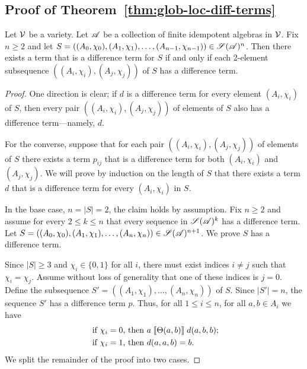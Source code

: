 \subsection{Proof of Theorem~\ref{thm:glob-loc-diff-terms}}
\label{sec:proof-thm:glob}
\begin{theorem}[\ref{thm:glob-loc-diff-terms}]
  Let $\mathcal{V}$ be a variety.  Let $\mathscr{A}$ be a collection of finite idempotent
  algebras in $\mathcal{V}$. Fix $n\geq 2$ and 
  let $S= ((A_0, \chi_0), (A_1, \chi_1), \dots, (A_{n-1}, \chi_{n-1}))\in \mathscr{S}(\mathscr{A})^n$.
  Then there exists a term that is a \glocal difference term for $S$
  if and only if each 2-element subsequence $((A_i,\chi_i), (A_j,\chi_j))$ of $S$
  has a \glocal difference term.
\end{theorem}
\begin{proof}
  One direction is clear; if $d$ is a \glocal difference term for every
  element $(A_i, \chi_i)$ of $S$, then  every pair $((A_i,\chi_i),
  (A_j,\chi_j))$ of elements of $S$ also has a \glocal difference
  term---namely, $d$.

  For the converse, suppose that
  for each pair $((A_i,\chi_i), (A_j,\chi_j))$ of elements of $S$ there exists a
  term $p_{ij}$ that is a \glocal difference term for both
  $(A_i,\chi_i)$ and $(A_j,\chi_j)$.
  We will prove by induction on the length of $S$ that
  there exists a term $d$ that is a \glocal difference term for every
  $(A_i, \chi_i)$ in $S$.

  In the base case, $n = |S| = 2$, the claim holds by assumption.
  Fix $n\geq 2$ and assume for every
  $2\leq k \leq n$ that every sequence in $\mathscr{S}(\mathscr{A})^k$
  has a \glocal difference term. Let
  $S = ((A_0, \chi_0), (A_1, \chi_1), \dots, (A_{n},\chi_{n})) \in \mathscr{S}(\mathscr{A})^{n+1}$.
  We prove  $S$ has a \glocal difference term.

  Since $|S| \geq 3$ and $\chi_i \in \{0,1\}$ for all $i$, there must exist
  indices $i\neq j$ such that $\chi_i = \chi_j$. Assume without loss of generality
  that one of these indices is $j=0$.  Define the subsequence
  $S' = ((A_1, \chi_1), \dots,(A_{n},\chi_{n}))$ of $S$. %
  Since $|S'| = n$, the sequence $S'$ has a \glocal difference term $p$.
  Thus, for all $1\leq i \leq n$,
  for all $a, b\in A_i$  we have
  \begin{align*}
    \text{ if $\chi_i=0$, then } &
    a \mathrel{\llbracket \Theta(a,b) \rrbracket} d(a,b,b);\\
    \text{ if $\chi_i=1$, then } &
    d(a,a,b) = b.
  \end{align*}
  We split the remainder of the proof into two cases.


\end{proof}
